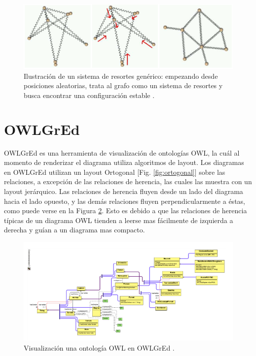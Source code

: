 \begin{figure}
	\centering
	\includegraphics[width=13cm]{imagenes/spring_systems.png}
	\caption{Ilustración de un sistema de resortes genérico: empezando desde posiciones aleatorias, trata al grafo como un sistema de resortes y busca encontrar una configuración estable \cite{gajer2002grip}.}
	\label{fig:spring_systems}
\end{figure}





\section{OWLGrEd}
OWLGrEd \cite{liepinvs2014owlgred} es una herramienta de visualización de ontologías OWL, la cuál al momento de renderizar el diagrama utiliza algoritmos de layout. Los diagramas en OWLGrEd utilizan un layout Ortogonal \cite{bekos2012smooth}[Fig. \ref{fig:ortogonal}] sobre las relaciones, a excepción de las relaciones de herencia, las cuales las muestra con un layout jerárquico. Las relaciones de herencia fluyen desde un lado del diagrama hacia el lado opuesto, y las demás relaciones fluyen perpendicularmente a éstas, como puede verse en la Figura \ref{fig:owlgred}. Esto es debido a que las relaciones de herencia típicas de un diagrama OWL tienden a leerse mas fácilmente de izquierda a derecha y guían a un diagrama mas compacto.

\begin{figure}[H]
	\centering
	\includegraphics[width=13cm]{imagenes/owlgred.png}
	\caption{Visualización una ontología OWL en OWLGrEd \cite{liepinvs2014owlgred}.}
	\label{fig:owlgred}
\end{figure}

